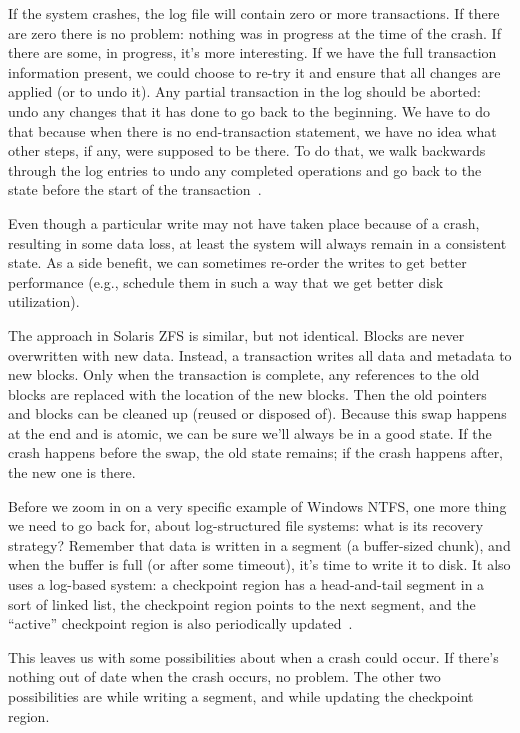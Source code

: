 If the system crashes, the log file will contain zero or more transactions. If there are zero there is no problem: nothing was in progress at the time of the crash. If there are some, in progress, it's more interesting. If we have the full transaction information present, we could choose to re-try it and ensure that all changes are applied (or to undo it). Any partial transaction in the log should be aborted: undo any changes that it has done to go back to the beginning. We have to do that because when there is no end-transaction statement, we have no idea what other steps, if any, were supposed to be there. To do that, we walk backwards through the log entries to undo any completed operations and go back to the state before the start of the transaction~\cite{osc}.

Even though a particular write may not have taken place because of a crash, resulting in some data loss, at least the system will always remain in a consistent state. As a side benefit, we can sometimes re-order the writes to get better performance (e.g., schedule them in such a way that we get better disk utilization). 

The approach in Solaris ZFS is similar, but not identical. Blocks are never overwritten with new data. Instead, a transaction writes all data and metadata to new blocks. Only when the transaction is complete, any references to the old blocks are replaced with the location of the new blocks. Then the old pointers and blocks can be cleaned up (reused or disposed of). Because this swap happens at the end and is atomic, we can be sure we'll always be in a good state. If the crash happens before the swap, the old state remains; if the crash happens after, the new one is there.

Before we zoom in on a very specific example of Windows NTFS, one more thing we need to go back for, about log-structured file systems: what is its recovery strategy? Remember that data is written in a segment (a buffer-sized chunk), and when the buffer is full (or after some timeout), it's time to write it to disk. It also uses a log-based system: a checkpoint region has a head-and-tail segment in a sort of linked list, the checkpoint region points to the next segment, and the ``active'' checkpoint region is also periodically updated~\cite{OSTEP}. 

This leaves us with some possibilities about when a crash could occur. If there's nothing out of date when the crash occurs, no problem. The other two possibilities are while writing a segment, and while updating the checkpoint region. 

